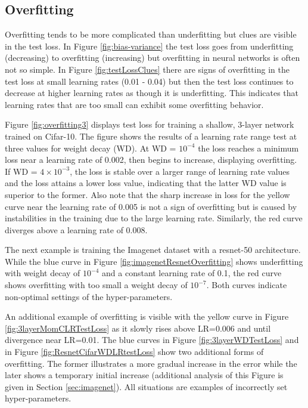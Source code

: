 \documentclass{article} %
\begin{document}
\subsection{Overfitting}
\label{sec:overfitting}

Overfitting tends to be more complicated than underfitting but clues are visible in the test loss.  In Figure \ref{fig:bias-variance} the test loss goes from underfitting (decreasing) to overfitting (increasing) but overfitting in neural networks is often not so simple.  In Figure \ref{fig:testLossClues} there are signs of overfitting in the test loss at small learning rates (0.01 - 0.04) but then the test loss continues to decrease at higher learning rates as though it is underfitting.  This indicates that learning rates that are too small can exhibit some overfitting behavior.

Figure \ref{fig:overfitting3} displays test loss for training a shallow, 3-layer network trained on Cifar-10.  The figure shows the results of a learning rate range test at three values for weight decay (WD).  At WD = $10^{-4}$ the loss reaches a minimum loss near a learning rate of 0.002, then begins to increase, displaying overfitting.  If WD = $4 \times 10^{-3}$, the loss is stable over a larger range of learning rate values and the loss attains a lower loss value, indicating that the latter WD value is superior to the former.  Also note that the sharp increase in loss for the yellow curve near the learning rate of 0.005 is not a sign of overfitting but is caused by instabilities in the training due to the large learning rate.  Similarly, the red curve diverges above a learning rate of 0.008.

The next example is training the Imagenet dataset with a resnet-50 architecture.  While the blue curve in Figure \ref{fig:imagenetResnetOverfitting}  shows underfitting with weight decay of $10^{-4}$ and a constant learning rate of 0.1, the red curve shows overfitting with too small a weight decay of $10^{-7}$.  Both curves indicate non-optimal settings of the hyper-parameters.  

An additional example of overfitting is visible with the yellow curve in Figure \ref{fig:3layerMomCLRTestLoss} as it slowly rises above LR=0.006 and until divergence near LR=0.01.  The blue curves in Figure \ref{fig:3layerWDTestLoss} and in Figure \ref{fig:ResnetCifarWDLRtestLoss} show two additional forms of overfitting.  The former illustrates a more gradual increase in the error while the later shows a temporary initial increase (additional analysis of this Figure is given in Section \ref{sec:imagenet}). All situations are examples of incorrectly set hyper-parameters.
\end{document}
